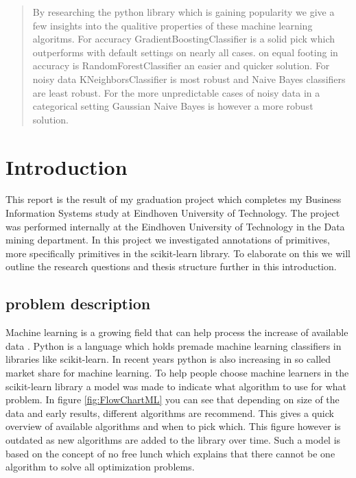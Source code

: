 \documentclass[a4paper,10pt]{article}
\begin{document}
\begin{abstract}
 By researching the python library which is gaining popularity we give a few insights into the qualitive properties of these machine learning algoritms. For accuracy GradientBoostingClassifier is a solid pick which outperforms with default settings on nearly all cases. on equal footing in accuracy is RandomForestClassifier an easier and quicker solution. For noisy data KNeighborsClassifier is most robust and Naive Bayes classifiers are least robust. For the more unpredictable cases of noisy data in a categorical setting Gaussian Naive Bayes is however a more robust solution.

\end{abstract}

\newpage
\tableofcontents
\newpage


\section{Introduction} \label{Chapter1}
This report is the result of my graduation project which completes my Business Information Systems study at Eindhoven University of Technology.
The project was performed internally at the Eindhoven University of Technology in the Data mining department.
In this project we investigated annotations of primitives, more specifically primitives in the scikit-learn library.
To elaborate on this we will outline the research questions and thesis structure further in this introduction.
 

\subsection{problem description}\label{Intr-Prob}
Machine learning is a growing field that can help process the increase of available data \cite{Big-data}\cite{ML-trends}. 
Python is a language which holds premade machine learning classifiers in libraries like scikit-learn\cite{scikit-learn}.
In recent years python is also increasing in so called market share for machine learning\cite{python-pop}.
To help people choose machine learners in the scikit-learn library a model was made to indicate what algorithm to use for what problem. In figure \ref{fig:FlowChartML} you can see that depending on size of the data and early results, different algorithms are recommend. This gives a quick overview of available algorithms and when to pick which. This figure however is outdated as new algorithms are added to the library over time. Such a model is based on the concept of no free lunch which explains that there cannot be one algorithm to solve all optimization problems\cite{No-Free-Lunch}.  
 
\end{document}
